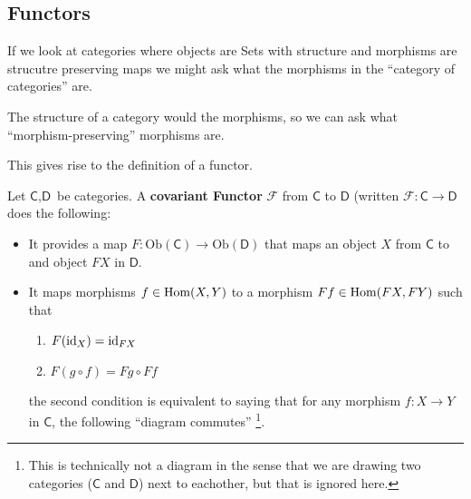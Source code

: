 \subsection{Functors}
If we look at categories where objects are Sets with structure and morphisms are strucutre preserving maps we might ask what the morphisms in the ``category of categories'' are.

The structure of a category would the morphisms, so we can ask what ``morphism-preserving'' morphisms are.

This gives rise to the definition of a functor.

\begin{dfn}[]
  Let $\textsf{C},\textsf{D}$ be categories. A \textbf{covariant Functor} $\mathcal{F}$ from $\textsf{C}$ to $\textsf{D}$ (written $\mathcal{F}: \textsf{C} \to  \textsf{D}$ does the following:

  \begin{itemize}
    \item It provides a map $F: \text{Ob}(\textsf{C}) \to  \text{Ob}(\textsf{D})$ that maps an object $X$ from $\textsf{C}$ to and object $F X$ in $\textsf{D}$.
    \item It maps morphisms $f \in \operatorname{Hom}(X,Y)$ to a morphism $F f \in \operatorname{Hom}(F X, F Y)$ such that
      \begin{enumerate}[{(}i{)}]
        \item $F (\operatorname{id}_X) = \operatorname{id}_{F X}$
        \item $F (g \circ f) = Fg \circ Ff$
      \end{enumerate}
      the second condition is equivalent to saying that for any morphism $f: X \to  Y$ in $\textsf{C}$, the following ``diagram commutes'' \footnote{This is technically not a diagram in the sense that we are drawing two categories ($\textsf{C}$ and $\textsf{D}$) next to eachother, but that is ignored here.}.
\begin{center}
\end{center}
  \end{itemize}
\end{dfn}




